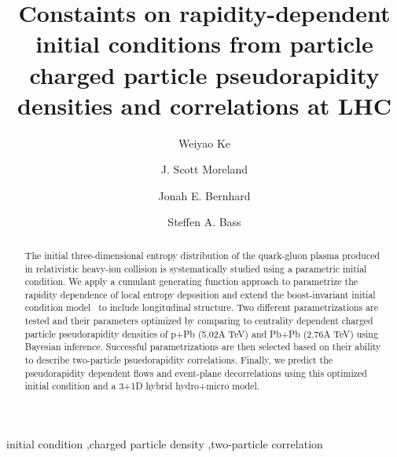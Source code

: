 \documentclass[3p,times,twocolumn]{elsarticle}
\begin{document}
\begin{frontmatter}



\dochead{}

\title{Constaints on rapidity-dependent initial conditions from particle charged particle pseudorapidity densities and correlations at LHC}


\author{Weiyao Ke}
\author{J. Scott Moreland}
\author{Jonah E. Bernhard}
\author{Steffen A. Bass}

\address{Department of Physics, Duke University, Durham, NC 27708-0305, United States}

\begin{abstract}
The initial three-dimensional entropy distribution of the quark-gluon plasma produced in relativistic heavy-ion collision is systematically studied using a parametric initial condition.
We apply a cumulant generating function approach to parametrize the rapidity dependence of local entropy deposition and extend the boost-invariant initial condition model \trento~to include longitudinal structure.
Two different parametrizations are tested and their parameters optimized by comparing to centrality dependent charged particle pseudorapidity densities of p+Pb (5.02A TeV) and Pb+Pb (2.76A TeV) using Bayesian inference.
Successful parametrizations are then selected based on their ability to describe two-particle psuedorapidity correlations.
Finally, we predict the pseudorapidity dependent flows and event-plane decorrelations using this optimized initial condition and a 3+1D hybrid hydro+micro model.

\end{abstract}

\begin{keyword}
initial condition \sep charged particle density \sep two-particle correlation


\end{keyword}

\end{frontmatter}
\end{document}
